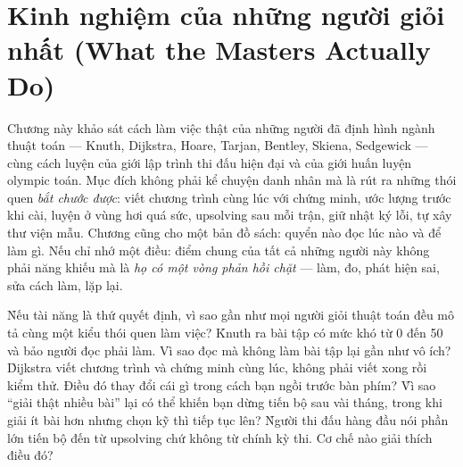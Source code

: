 \documentclass[../../algorithm.tex]{subfiles}
\begin{document}
\chapter{Kinh nghiệm của những người giỏi nhất (What the Masters Actually Do)}

\begin{tomtat}
Chương này khảo sát cách làm việc thật của những người đã định hình ngành thuật toán --- Knuth, Dijkstra, Hoare, Tarjan, Bentley, Skiena, Sedgewick --- cùng cách luyện của giới lập trình thi đấu hiện đại và của giới huấn luyện olympic toán. Mục đích không phải kể chuyện danh nhân mà là rút ra những thói quen \emph{bắt chước được}: viết chương trình cùng lúc với chứng minh, ước lượng trước khi cài, luyện ở vùng hơi quá sức, upsolving sau mỗi trận, giữ nhật ký lỗi, tự xây thư viện mẫu. Chương cũng cho một bản đồ sách: quyển nào đọc lúc nào và để làm gì. Nếu chỉ nhớ một điều: điểm chung của tất cả những người này không phải năng khiếu mà là \emph{họ có một vòng phản hồi chặt} --- làm, đo, phát hiện sai, sửa cách làm, lặp lại.
\end{tomtat}

\begin{nentang}
\end{nentang}

\begin{khoigoi}
\h{Nếu tài năng là thứ quyết định, vì sao gần như mọi người giỏi thuật toán đều mô tả cùng một kiểu thói quen làm việc?}
\h{Knuth ra bài tập có mức khó từ 0 đến 50 và bảo người đọc phải làm. Vì sao đọc mà không làm bài tập lại gần như vô ích?}
\h{Dijkstra viết chương trình và chứng minh cùng lúc, không phải viết xong rồi kiểm thử. Điều đó thay đổi cái gì trong cách bạn ngồi trước bàn phím?}
\h{Vì sao ``giải thật nhiều bài'' lại có thể khiến bạn dừng tiến bộ sau vài tháng, trong khi giải ít bài hơn nhưng chọn kỹ thì tiếp tục lên?}
\h{Người thi đấu hàng đầu nói phần lớn tiến bộ đến từ upsolving chứ không từ chính kỳ thi. Cơ chế nào giải thích điều đó?}
\end{khoigoi}
\end{document}
